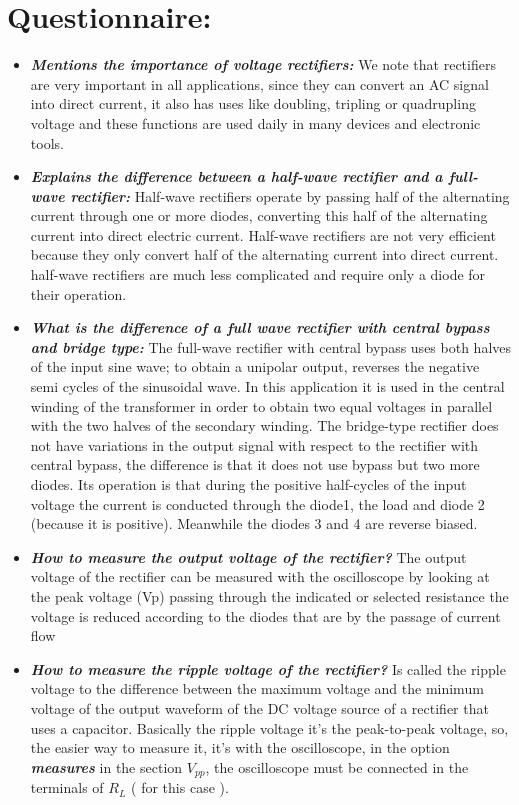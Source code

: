 \section{Questionnaire:}

\begin{itemize}
\item {\bfseries\itshape Mentions the importance of voltage rectifiers:} We note that rectifiers are very important in all applications, since they can convert an AC signal into direct current, it also has uses like doubling, tripling or quadrupling voltage and these functions are used daily in many devices and electronic tools.

\item {\bfseries\itshape Explains the difference between a half-wave rectifier and a full-wave rectifier:}
Half-wave rectifiers operate by passing half of the alternating current through one or more diodes, converting this half of the alternating current into direct electric current. Half-wave rectifiers are not very efficient because they only convert half of the alternating current into direct current. half-wave rectifiers are much less complicated and require only a diode for their operation.

\item {\bfseries\itshape What is the difference of a full wave rectifier with central bypass and bridge type:} The full-wave rectifier with central bypass uses both halves of the input sine wave; to obtain a unipolar output, reverses the negative semi cycles of the sinusoidal wave. In this application it is used in the central winding of the transformer in order to obtain two equal voltages in parallel with the two halves of the secondary winding. The bridge-type rectifier does not have variations in the output signal with respect to the rectifier with central bypass, the difference is that it does not use bypass but two more diodes. Its operation is that during the positive half-cycles of the input voltage the current is conducted through the diode1, the load and diode 2 (because it is positive). Meanwhile the diodes 3 and 4 are reverse biased.

\item {\bfseries\itshape How to measure the output voltage of the rectifier?} The output voltage of the rectifier can be measured with the oscilloscope by looking at the peak voltage (Vp) passing through the indicated or selected resistance the voltage is reduced according to the diodes that are by the passage of current flow

\item {\bfseries\itshape How to measure the ripple voltage of the rectifier?} Is called the ripple voltage to the difference between the maximum voltage and the minimum voltage of the output waveform of the DC voltage source of a rectifier that uses a capacitor. Basically the ripple voltage it's the peak-to-peak voltage, so, the easier way to measure it, it's with the oscilloscope, in the option {\bfseries\itshape measures} in the section $V_{pp}$, the oscilloscope must be connected in the terminals of $R_{L}$ ( for this case ).  
\end{itemize}
\pagebreak